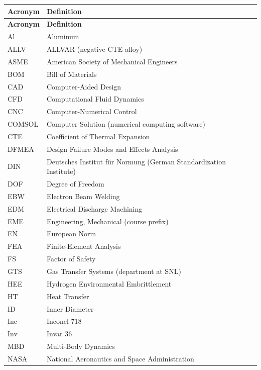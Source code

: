 \documentclass[12pt, letterpaper]{report}%
\begin{document}
	\begin{longtable}{@{} l p{} @{}}
		\toprule
		\textbf{Acronym} & \textbf{Definition} \\
		\midrule
		\endfirsthead

		\toprule
		\textbf{Acronym} & \textbf{Definition} \\
		\midrule
		\endhead

		\bottomrule
		\endfoot

		\bottomrule
		\endlastfoot

		Al      & Aluminum \\
		ALLV    & ALLVAR (negative-CTE alloy) \\
		ASME    & American Society of Mechanical Engineers \\
		BOM     & Bill of Materials \\
		CAD     & Computer-Aided Design \\
		CFD			& Computational Fluid Dynamics \\
		CNC			& Computer-Numerical Control \\
		COMSOL	& Computer Solution (numerical computing software) \\
		CTE     & Coefficient of Thermal Expansion \\
		DFMEA   & Design Failure Modes and Effects Analysis \\
		DIN			& Deutsches Institut für Normung (German Standardization Institute) \\
		DOF     & Degree of Freedom \\
		EBW     & Electron Beam Welding \\
		EDM     & Electrical Discharge Machining \\
		EME     & Engineering, Mechanical (course prefix) \\
		EN			& European Norm \\
		FEA			& Finite-Element Analysis \\
		FS      & Factor of Safety \\
		GTS			& Gas Transfer Systems (department at SNL) \\
		HEE			& Hydrogen Environmental Embrittlement \\
		HT			& Heat Transfer \\
		ID			& Inner Diameter \\
		Inc     & Inconel 718 \\
		Inv     & Invar 36 \\
		MBD			& Multi-Body Dynamics \\
		NASA    & National Aeronautics and Space Administration \\

\end{longtable}
\end{document}
